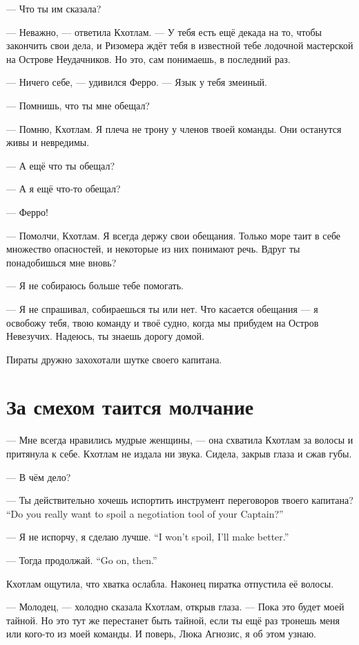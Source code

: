 \asterism

--- Что ты им сказала?

--- Неважно, --- ответила Кхотлам.
--- У тебя есть ещё декада на то, чтобы закончить свои дела, и Ризомера ждёт тебя в известной тебе лодочной мастерской на Острове Неудачников.
Но это, сам понимаешь, в последний раз.

--- Ничего себе, --- удивился Ферро.
--- Язык у тебя змеиный.

--- Помнишь, что ты мне обещал?

--- Помню, Кхотлам.
Я плеча не трону у членов твоей команды.
Они останутся живы и невредимы.

--- А ещё что ты обещал?

--- А я ещё что-то обещал?

--- Ферро!

--- Помолчи, Кхотлам.
Я всегда держу свои обещания.
Только море таит в себе множество опасностей, и некоторые из них понимают речь.
Вдруг ты понадобишься мне вновь?

--- Я не собираюсь больше тебе помогать.

--- Я не спрашивал, собираешься ты или нет.
Что касается обещания --- я освобожу тебя, твою команду и твоё судно, когда мы прибудем на Остров Невезучих.
Надеюсь, ты знаешь дорогу домой.

Пираты дружно захохотали шутке своего капитана.

\section{За смехом таится молчание}

--- Мне всегда нравились мудрые женщины, --- она схватила Кхотлам за волосы и притянула к себе.
Кхотлам не издала ни звука.
Сидела, закрыв глаза и сжав губы.

--- В чём дело?

{--- Ты действительно хочешь испортить инструмент переговоров твоего капитана?}
{``Do you really want to spoil a negotiation tool of your Captain?''}

{--- Я не испорчу, я сделаю лучше.}
{``I won't spoil, I'll make better.''}

{--- Тогда продолжай.}
{``Go on, then.''}

Кхотлам ощутила, что хватка ослабла.
Наконец пиратка отпустила её волосы.

--- Молодец, --- холодно сказала Кхотлам, открыв глаза.
--- Пока это будет моей тайной.
Но это тут же перестанет быть тайной, если ты ещё раз тронешь меня или кого-то из моей команды.
И поверь, Люка Агнозис, я об этом узнаю.


